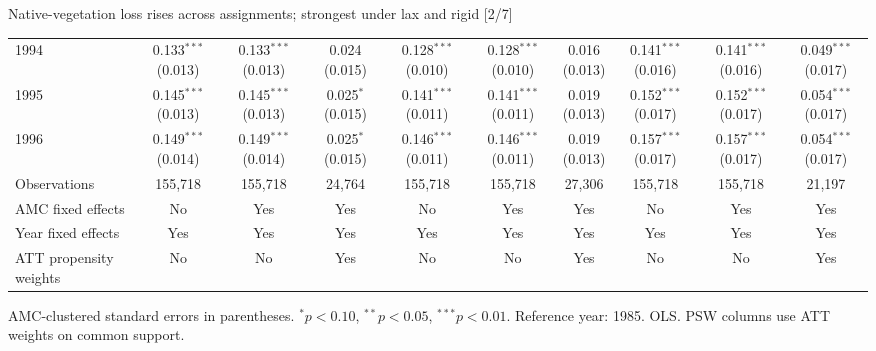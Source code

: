 \documentclass[aspectratio=169]{beamer}
\begin{document}
\begin{frame}{Native-vegetation loss rises across assignments; strongest under lax and rigid [2/7]}
{\begin{tabular}{@{}l*{9}{c}@{}}
1994 & \shortstack{0.133$^{***}$\\(0.013)} & \shortstack{0.133$^{***}$\\(0.013)} & \shortstack{0.024\\(0.015)} & \shortstack{0.128$^{***}$\\(0.010)} & \shortstack{0.128$^{***}$\\(0.010)} & \shortstack{0.016\\(0.013)} & \shortstack{0.141$^{***}$\\(0.016)} & \shortstack{0.141$^{***}$\\(0.016)} & \shortstack{0.049$^{***}$\\(0.017)} \\
1995 & \shortstack{0.145$^{***}$\\(0.013)} & \shortstack{0.145$^{***}$\\(0.013)} & \shortstack{0.025$^{*}$\\(0.015)} & \shortstack{0.141$^{***}$\\(0.011)} & \shortstack{0.141$^{***}$\\(0.011)} & \shortstack{0.019\\(0.013)} & \shortstack{0.152$^{***}$\\(0.017)} & \shortstack{0.152$^{***}$\\(0.017)} & \shortstack{0.054$^{***}$\\(0.017)} \\
1996 & \shortstack{0.149$^{***}$\\(0.014)} & \shortstack{0.149$^{***}$\\(0.014)} & \shortstack{0.025$^{*}$\\(0.015)} & \shortstack{0.146$^{***}$\\(0.011)} & \shortstack{0.146$^{***}$\\(0.011)} & \shortstack{0.019\\(0.013)} & \shortstack{0.157$^{***}$\\(0.017)} & \shortstack{0.157$^{***}$\\(0.017)} & \shortstack{0.054$^{***}$\\(0.017)} \\
\midrule
Observations & 155,718 & 155,718 & 24,764 & 155,718 & 155,718 & 27,306 & 155,718 & 155,718 & 21,197 \\
AMC fixed effects & No & Yes & Yes & No & Yes & Yes & No & Yes & Yes \\
Year fixed effects & Yes & Yes & Yes & Yes & Yes & Yes & Yes & Yes & Yes \\
ATT propensity weights & No & No & Yes & No & No & Yes & No & No & Yes \\
\bottomrule
\end{tabular}%
}
\vspace{0.1em}
{\tiny\color{ZMidGray} AMC-clustered standard errors in parentheses. $^{*}p<0.10$, $^{**}p<0.05$, $^{***}p<0.01$. Reference year: 1985. OLS. PSW columns use ATT weights on common support.}
\end{frame}
\end{document}
